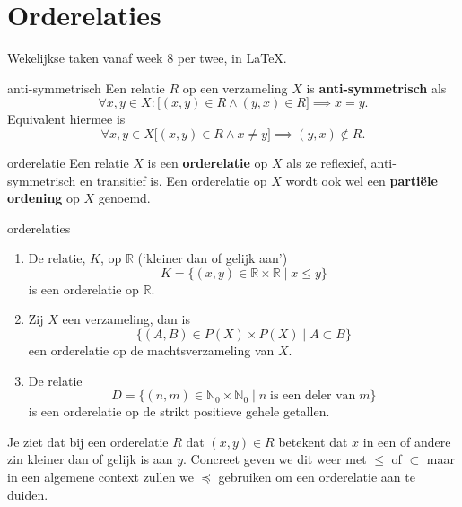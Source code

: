 \setcounter{chapter}{6}


\chapter{Orderelaties}
Wekelijkse taken vanaf week 8 per twee, in \LaTeX.

\begin{definitie}{}{anti-symmetrisch}
    Een relatie $R$ op een verzameling  $X$ is \textbf{anti-symmetrisch} als
    \[
        \forall x,y \in X: \lbrack(x,y) \in R \land (y,x) \in R\rbrack \implies x = y.
    \]
    Equivalent hiermee is
    \[
        \forall x,y \in X \lbrack(x,y) \in R \land x \neq y\rbrack \implies (y,x) \notin R.
    \]
\end{definitie}

\begin{definitie}{}{orderelatie}
    Een relatie $X$ is een \textbf{orderelatie} op $X$ als ze reflexief, anti-symmetrisch en transitief is.
    Een orderelatie op $X$ wordt ook wel een \textbf{partiële ordening} op $X$ genoemd.
\end{definitie}

\begin{voorbeeld}{}{orderelaties}
    \begin{enumerate}[label = (\alph*)]
        \item De relatie, $K$, op $\mathbb{R}$ (`kleiner dan of gelijk aan')
            \[
                K = \{(x,y) \in \mathbb{R} \times \mathbb{R} \mid x \leq y \}
            \]
            is een orderelatie op $\mathbb{R}$.\label{item:orderelatie-kdg}
        \item Zij $X$ een verzameling, dan is
            \[
            \{(A,B) \in P(X)\times P(X) \mid A \subset B \}
        \] een orderelatie op de machtsverzameling van $X$.\label{item:orderelatie-P}
        \item De relatie
            \[
                D = \{(n,m) \in \mathbb{N}_0 \times \mathbb{N}_0 \mid n\; \text{is een deler van}\; m\}
            \] is een orderelatie op de strikt positieve gehele getallen.\label{item:orderelatie-gehele-getallen}
    \end{enumerate}
\end{voorbeeld}

Je ziet dat bij een orderelatie $R$ dat $(x,y) \in R$ betekent dat $x$ in een of andere zin kleiner dan of gelijk is aan $y$.
Concreet geven we dit weer met $\leq$ of $\subset$ maar in een algemene context zullen we $\preceq$ gebruiken om een orderelatie aan te duiden.

